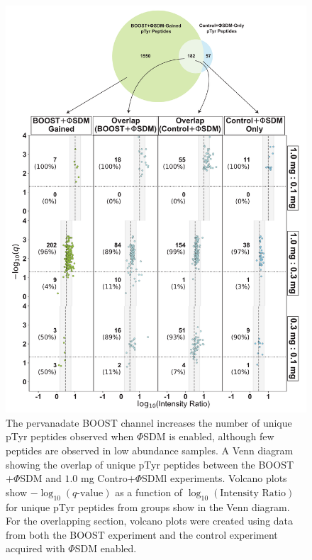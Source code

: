 \documentclass[journal=jprobs,manuscript=article]{achemso}
\begin{document}
\begin{figure}[t!]
\centering
\includegraphics[width=135mm]{figures/supplements/boostsdm_controlsdm_gained_qvolcanoes.pdf}
\caption{The pervanadate BOOST channel increases the number of unique pTyr peptides observed when $\Phi$SDM is enabled, although few peptides are observed in low abundance samples. A Venn diagram showing the overlap of unique pTyr peptides between the BOOST$+\Phi$SDM and $1.0$ mg Contro$+\Phi$SDMl experiments. Volcano plots show $-\log_{10}(q\text{-value})$ as a function of $\log_{10}(\text{Intensity Ratio})$ for unique pTyr peptides from groups show in the Venn diagram. For the overlapping section, volcano plots were created using data from both the BOOST experiment and the control experiment acquired with $\Phi$SDM enabled. }\label{boostsdm_controlsdm_gained_qvolcanoes}
\end{figure}
\end{document}
